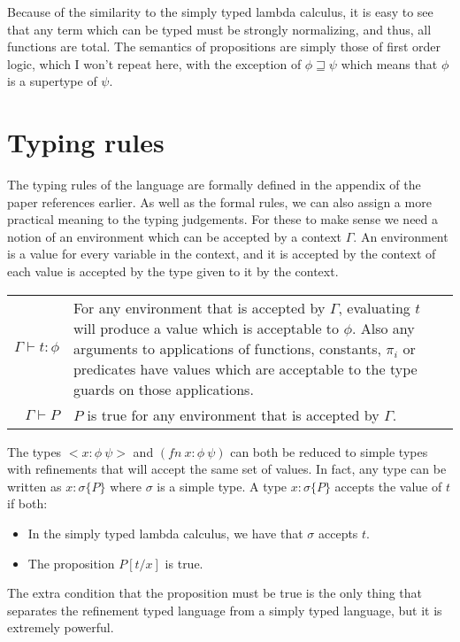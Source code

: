 \documentclass[12pt,a4paper,titlepage]{article}
\begin{document}
    Because of the similarity to the simply typed lambda calculus, it is easy to see that any term which can be
    typed must be strongly normalizing, and thus, all functions are total.
    The semantics of propositions are simply those of first order logic, which I won't repeat here,
    with the exception of $\phi \sqsupseteq \psi$ which means that $\phi$ is a supertype of $\psi$.

    \section{Typing rules}
    The typing rules of the language are formally defined in the appendix of the paper references earlier.
    As well as the formal rules, we can also assign a more practical meaning to the typing judgements.
    For these to make sense we need a notion of an environment which can be accepted by a context $\Gamma$.
    An environment is a value for every variable in the context, and it is accepted by the context of each
    value is accepted by the type given to it by the context.

    \renewcommand{\arraystretch}{2}
    \begin{tabular}{>{$}r<{$}p{}}
        \Gamma \vdash t : \phi &
        For any environment that is accepted by $\Gamma$, evaluating $t$ will produce a value which is acceptable
        to $\phi$. Also any arguments to applications of functions, constants, $\pi_i$ or predicates have values
        which are acceptable to the type guards on those applications.
        \\
        \Gamma \vdash P &
        $P$ is true for any environment that is accepted by $\Gamma$.
        \\
    \end{tabular}
    \renewcommand{\arraystretch}{1}

    The types $<x:\phi\ \psi>$ and $(fn\ x:\phi\ \psi)$ can both be reduced to simple types with refinements
    that will accept the same set of values.
    In fact, any type can be written as $x:\sigma\{P\}$ where $\sigma$ is a simple type.
    A type $x:\sigma\{P\}$ accepts the value of $t$ if both:
    \begin{itemize}
        \item In the simply typed lambda calculus, we have that $\sigma$ accepts $t$.
        \item The proposition $P[t/x]$ is true.
    \end{itemize}
    The extra condition that the proposition must be true is the only thing that separates the refinement typed
    language from a simply typed language, but it is extremely powerful.

    
    
\end{document}
